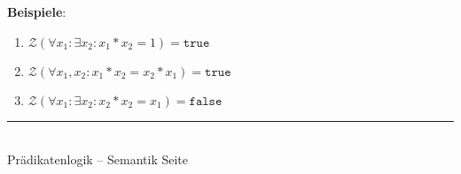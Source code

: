 \documentclass{slides}
\newcommand{\myrule}{\rule{20cm}{1mm}\\ }
\newcounter{mypage}
\begin{document}
\begin{slide}{}
\textbf{Beispiele}: 
\begin{enumerate}
\item $\mathcal{Z}( \forall x_1: \exists x_2: x_1 * x_2 = 1) = \mathtt{true}$
\item $\mathcal{Z}( \forall x_1, x_2: x_1 * x_2 = x_2 * x_1) = \mathtt{true}$
\item $\mathcal{Z}( \forall x_1: \exists x_2: x_2 * x_2 = x_1) = \mathtt{false}$
\end{enumerate}

\vspace*{\fill}
\tiny \addtocounter{mypage}{1}
\myrule
Pr\"{a}dikatenlogik -- Semantik  \hspace*{\fill} Seite 
\end{slide}

\end{document}
